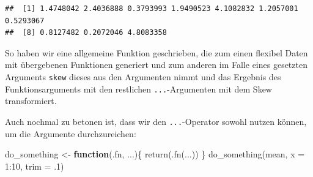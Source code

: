 \documentclass[
]{book}
\newenvironment{Shaded}{\begin{snugshade}}{\end{snugshade}}
\newcommand{\AttributeTok}[1]{\textcolor[rgb]{0.77,0.63,0.00}{#1}}
\newcommand{\ControlFlowTok}[1]{\textcolor[rgb]{0.13,0.29,0.53}{\textbf{#1}}}
\newcommand{\DecValTok}[1]{\textcolor[rgb]{0.00,0.00,0.81}{#1}}
\newcommand{\FunctionTok}[1]{\textcolor[rgb]{0.00,0.00,0.00}{#1}}
\newcommand{\NormalTok}[1]{#1}
\newcommand{\OtherTok}[1]{\textcolor[rgb]{0.56,0.35,0.01}{#1}}
\newcommand{\SpecialCharTok}[1]{\textcolor[rgb]{0.00,0.00,0.00}{#1}}
\newcommand{\StringTok}[1]{\textcolor[rgb]{0.31,0.60,0.02}{#1}}
\begin{document}
\begin{Shaded}
\end{Shaded}

\begin{verbatim}
##  [1] 1.4748042 2.4036888 0.3793993 1.9490523 4.1082832 1.2057001 0.5293067
##  [8] 0.8127482 0.2072046 4.8083358
\end{verbatim}

So haben wir eine allgemeine Funktion geschrieben, die zum einen flexibel Daten mit übergebenen Funktionen generiert und zum anderen im Falle eines gesetzten Arguments \texttt{skew} dieses aus den Argumenten nimmt und das Ergebnis des Funktionsarguments mit den restlichen \texttt{...}-Argumenten mit dem Skew transformiert.

Auch nochmal zu betonen ist, dass wir den \texttt{...}-Operator sowohl nutzen können, um die Argumente durchzureichen:

\begin{Shaded}
\begin{Highlighting}[]
\NormalTok{do\_something }\OtherTok{\textless{}{-}} \ControlFlowTok{function}\NormalTok{(.fn, ...)\{}
  \FunctionTok{return}\NormalTok{(}\FunctionTok{.fn}\NormalTok{(...))}
\NormalTok{\}}
\FunctionTok{do\_something}\NormalTok{(mean, }\AttributeTok{x =} \DecValTok{1}\SpecialCharTok{:}\DecValTok{10}\NormalTok{, }\AttributeTok{trim =}\NormalTok{ .}\DecValTok{1}\NormalTok{)}
\end{Highlighting}
\end{Shaded}
\end{document}

